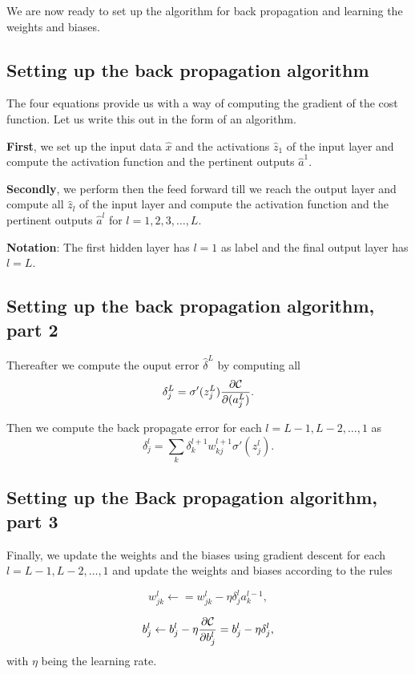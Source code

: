 \documentclass[%
oneside,                 %
final,                   %
10pt]{article}
\begin{document}
We are now ready to set up the algorithm for back propagation and learning the weights and biases.

\subsection{Setting up the back propagation algorithm}

The four equations  provide us with a way of computing the gradient of the cost function. Let us write this out in the form of an algorithm.

\textbf{First}, we set up the input data $\hat{x}$ and the activations
$\hat{z}_1$ of the input layer and compute the activation function and
the pertinent outputs $\hat{a}^1$.

\textbf{Secondly}, we perform then the feed forward till we reach the output
layer and compute all $\hat{z}_l$ of the input layer and compute the
activation function and the pertinent outputs $\hat{a}^l$ for
$l=1,2,3,\dots,L$.

\textbf{Notation}: The first hidden layer has $l=1$ as label and the final output layer has $l=L$.

\subsection{Setting up the back propagation algorithm, part 2}

Thereafter we compute the ouput error $\hat{\delta}^L$ by computing all
\[
\delta_j^L = \sigma'(z_j^L)\frac{\partial {\cal C}}{\partial (a_j^L)}.
\]

Then we compute the back propagate error for each $l=L-1,L-2,\dots,1$ as
\[
\delta_j^l = \sum_k \delta_k^{l+1}w_{kj}^{l+1}\sigma'(z_j^l).
\]

\subsection{Setting up the Back propagation algorithm, part 3}

Finally, we update the weights and the biases using gradient descent
for each $l=L-1,L-2,\dots,1$ and update the weights and biases
according to the rules

\[
w_{jk}^l\leftarrow  = w_{jk}^l- \eta \delta_j^la_k^{l-1},
\]

\[
b_j^l \leftarrow b_j^l-\eta \frac{\partial {\cal C}}{\partial b_j^l}=b_j^l-\eta \delta_j^l,
\]
with $\eta$ being the learning rate.
\end{document}
